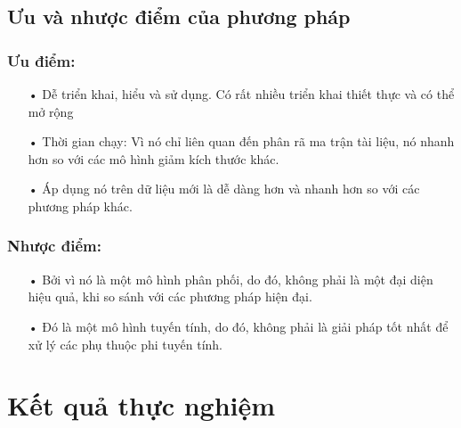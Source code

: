 \documentclass[a4paper,10pt]{report}
\begin{document}
\section{Ưu và nhược điểm của phương pháp}
\subsection{Ưu điểm:}
\begin{itemize}
\item[•] Dễ triển khai, hiểu và sử dụng. Có rất nhiều triển khai thiết thực và có thể mở rộng
\item[•] Thời gian chạy: Vì nó chỉ liên quan đến phân rã ma trận tài liệu, nó nhanh hơn so với các mô hình giảm kích thước khác.
\item[•] Áp dụng nó trên dữ liệu mới là dễ dàng hơn và nhanh hơn so với các phương pháp khác.
\end{itemize}
\subsection{Nhược điểm:}
\begin{itemize}
\item[•] Bởi vì nó là một mô hình phân phối, do đó, không phải là một đại diện hiệu quả, khi so sánh với các phương pháp hiện đại.
\item[•] Đó là một mô hình tuyến tính, do đó, không phải là giải pháp tốt nhất để xử lý các phụ thuộc phi tuyến tính.
\end{itemize}
\chapter{Kết quả thực nghiệm}
\end{document}

